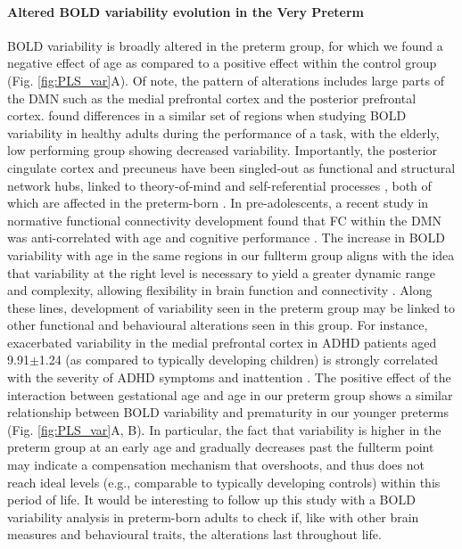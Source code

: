 \paragraph{Altered BOLD variability evolution in the Very Preterm}
BOLD variability is broadly altered in the preterm group, for which we found a negative effect of age as compared to a positive effect within the control group (Fig. \ref{fig:PLS_var}A). Of note, the pattern of alterations includes large parts of the DMN such as the medial prefrontal cortex and the posterior prefrontal cortex. \cite{Garrett2011} found differences in a similar set of regions when studying BOLD variability in healthy adults during the performance of a task, with the elderly, low performing group showing decreased variability. Importantly, the posterior cingulate cortex and precuneus have been singled-out as functional and structural network hubs, linked to theory-of-mind and self-referential processes \citep{Spreng2009,VandenHeuvel2013}, both of which are affected in the preterm-born\cite{} . In pre-adolescents, a recent study in normative functional connectivity development found that FC within the DMN was anti-correlated with age and cognitive performance \citep{Jiang2018}. The increase in BOLD variability with age in the same regions in our fullterm group aligns with the idea that variability at the right level is necessary to yield a greater dynamic range and complexity, allowing flexibility in brain function and connectivity \citep{McIntosh2010,Deco2011,Garrett2013b}.
Along these lines, development of variability seen in the preterm group may be linked to other functional and behavioural alterations seen in this group. For instance, exacerbated variability in the medial prefrontal cortex in ADHD patients aged 9.91$\pm$1.24 (as compared to typically developing children) is strongly correlated with the severity of ADHD symptoms and inattention \citep{Nomi2018}. The positive effect of the interaction between gestational age and age in our preterm group shows a similar relationship between BOLD variability and prematurity in our younger preterms (Fig. \ref{fig:PLS_var}A, B). In particular, the fact that variability is higher in the preterm group at an early age and gradually decreases past the fullterm point may indicate a compensation mechanism that overshoots, and thus does not reach ideal levels (e.g., comparable to typically developing controls) within this period of life. It would be interesting to follow up this study with a BOLD variability analysis in preterm-born adults to check if, like with other brain measures and behavioural traits, the alterations last throughout life.

